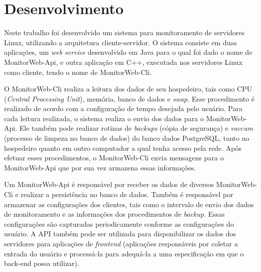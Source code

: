 
\chapter{Desenvolvimento}\label{cap:Desenvolvimento}

Neste trabalho foi desenvolvido um sistema para monitoramento de servidores Linux, utilizando a arquitetura cliente-servidor. O sistema consiste em duas aplicações, um \textit{web service} desenvolvido em Java para o qual foi dado o nome de MonitorWeb-Api, e outra aplicação em C++, executada nos servidores Linux como cliente, tendo o nome de MonitorWeb-Cli.

O MonitorWeb-Cli realiza a leitura dos dados de seu hospedeiro, tais como CPU (\textit{Central Processing Unit}), memória, banco de dados e \textit{swap}. Esse procedimento é realizado de acordo com a configuração de tempo desejada pelo usuário. Para cada leitura realizada, o sistema realiza o envio dos dados para o MonitorWeb-Api. Ele também pode realizar rotinas de \textit{backups} (cópia de segurança) e \textit{vaccum} (processo de limpeza no banco de dados) do banco dados PostgreSQL, tanto no hospedeiro quanto em outro computador a qual tenha acesso pela rede. Após efetuar esses procedimentos, o MonitorWeb-Cli envia mensagens para o MonitorWeb-Api que por sua vez armazena essas informações.

Um MonitorWeb-Api é responsável por receber os dados de diversos MonitorWeb-Cli e realizar a persistência no banco de dados. Também é responsável por armazenar as configurações dos clientes, tais como o intervalo de envio dos dados de monitoramento e as informações dos procedimentos de \textit{backup}. Essas configurações são capturadas periodicamente conforme as configurações do usuário. A API também pode ser utilizada para disponibilizar os dados dos servidores para aplicações de \textit{frontend} (aplicações responsáveis por coletar a entrada do usuário e processá-la para adequá-la a uma especificação em que o back-end possa utilizar).


